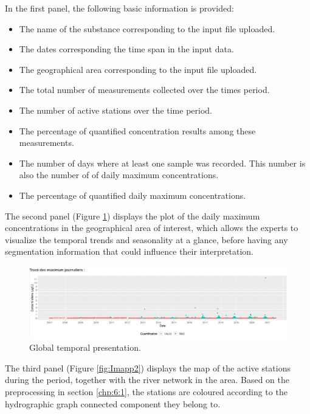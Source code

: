 In the first panel, the following basic information is provided:
\begin{itemize}
\item The name of the substance corresponding to the input file uploaded.
\item The dates corresponding the time span in the input data.
\item The geographical area corresponding to the input file uploaded.
\item The total number of measurements collected over the times period.
\item The number of active stations over the time period.
\item The percentage of quantified concentration results among these measurements. 
\item The number of days where at least one sample was recorded. This number is also the number of of daily maximum concentrations. 
\item The percentage of quantified daily maximum concentrations.
\end{itemize}

The second panel (Figure \ref{fig:Imapp1}) displays the plot of the daily maximum concentrations in the geographical area of interest, which allows the experts to visualize the temporal trends and seasonality at a glance, before having any segmentation information that could influence their interpretation.

\begin{figure}[htbp]
  \centering
  \includegraphics[]{figs/Chap6/Im_app1.pdf}
  \caption{Global temporal presentation.}
  \label{fig:Imapp1}
\end{figure}

The third panel (Figure \ref{fig:Imapp2}) displays the map of the active stations during the period, together with the river network in the area. Based on the preprocessing in section \ref{chp:6:1}, the stations are coloured according to the hydrographic graph connected component they belong to. 

